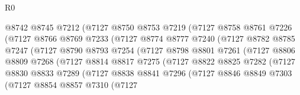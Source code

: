 \begin{lexlean}{R0}
\begin{coremodule}
                        @8742
                        @8745
                        @7212
                        (@7127
                          @8750
                          @8753
                          @7219
                          (@7127
                            @8758
                            @8761
                            @7226
                            (@7127
                              @8766
                              @8769
                              @7233
                              (@7127
                                @8774
                                @8777
                                @7240
                                (@7127
                                  @8782
                                  @8785
                                  @7247
                                  (@7127
                                    @8790
                                    @8793
                                    @7254
                                    (@7127
                                      @8798
                                      @8801
                                      @7261
                                      (@7127
                                        @8806
                                        @8809
                                        @7268
                                        (@7127
                                          @8814
                                          @8817
                                          @7275
                                          (@7127
                                            @8822
                                            @8825
                                            @7282
                                            (@7127
                                              @8830
                                              @8833
                                              @7289
                                              (@7127
                                                @8838
                                                @8841
                                                @7296
                                                (@7127
                                                  @8846
                                                  @8849
                                                  @7303
                                                  (@7127
                                                    @8854
                                                    @8857
                                                    @7310
                                                    (@7127

\end{coremodule}
\end{lexlean}
